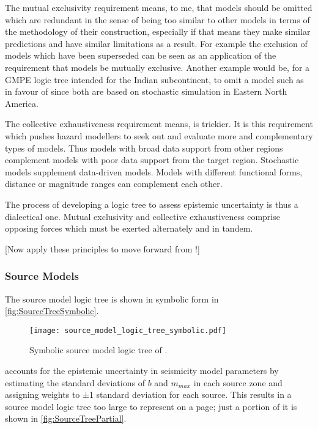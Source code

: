 \documentclass{article}
\begin{document}
The mutual exclusivity requirement means, to me, that models should be omitted which are redundant in the sense of being too similar to other models in terms of the methodology of their construction, especially if that means they make similar predictions and have similar limitations as a result. For example the exclusion of models which have been superseded \citep{cotton2006criteria} can be seen as an application of the requirement that models be mutually exclusive. Another example would be, for a GMPE logic tree intended for the Indian subcontinent, to omit a model such as \cite{hwang1997attenuation} in favour of \cite{atkinson2006earthquake} since both are based on stochastic simulation in Eastern North America.

The collective exhaustiveness requirement means, is trickier. It is this requirement which pushes hazard modellers to seek out and evaluate more and complementary types of models. Thus models with broad data support from other regions complement models with poor data support from the target region. Stochastic models supplement data-driven models. Models with different functional forms, distance or magnitude ranges can complement each other.

The process of developing a logic tree to assess epistemic uncertainty is thus a dialectical one. Mutual exclusivity and collective exhaustiveness comprise opposing forces which must be exerted alternately and in tandem.

[Now apply these principles to move forward from \cite{nath2012probabilistic}!] 

\subsubsection{Source Models}
\label{subsubsec:SourceTree}

The source model logic tree is shown in symbolic form in \autoref{fig:SourceTreeSymbolic}.

\begin{figure}[!htb]
\begin{adjustbox}{center}
\texttt{[image: source\_model\_logic\_tree\_symbolic.pdf]}
\end{adjustbox}
\caption[Symbolic source model logic tree]{Symbolic source model logic tree of \cite{nath2012probabilistic}.}
\label{fig:SourceTreeSymbolic}
\end{figure}

\cite{nath2012probabilistic} accounts for the epistemic uncertainty in seismicity model parameters by estimating the standard deviations of $b$ and $m_{max}$ in each source zone and assigning weights to ±1 standard deviation for each source. This results in a source model logic tree too large to represent on a page; just a portion of it is shown in \autoref{fig:SourceTreePartial}. 
\end{document}
